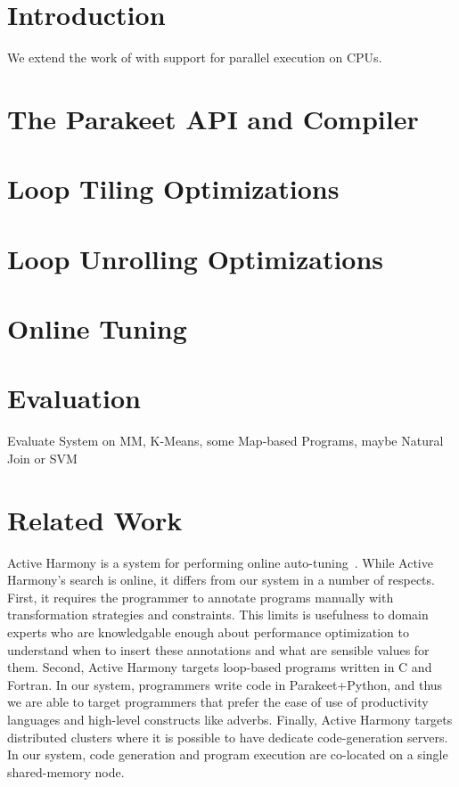 \documentclass[preprint,9pt]{sigplanconf}
\begin{document}



\section{Introduction}
We extend the work of \cite{Rubi12} with support for parallel execution on CPUs.

\section{The Parakeet API and Compiler}

\section{Loop Tiling Optimizations}

\section{Loop Unrolling Optimizations}

\section{Online Tuning}

\section{Evaluation}
Evaluate System on MM, K-Means, some Map-based Programs, maybe Natural Join or SVM

\section{Related Work}
Active Harmony is a system for performing online auto-tuning~\cite{Tiwa11, Tiwa09}.  While Active Harmony's search is online, it differs from our system in a number of respects.  First, it requires the programmer to annotate programs manually with transformation strategies and constraints.  This limits is usefulness to domain experts who are knowledgable enough about performance optimization to understand when to insert these annotations and what are sensible values for them.  Second, Active Harmony targets loop-based programs written in C and Fortran.  In our system, programmers write code in Parakeet+Python, and thus we are able to target programmers that prefer the ease of use of productivity languages and high-level constructs like adverbs.  Finally, Active Harmony targets distributed clusters where it is possible to have dedicate code-generation servers.  In our system, code generation and program execution are co-located on a single shared-memory node.
\end{document}
